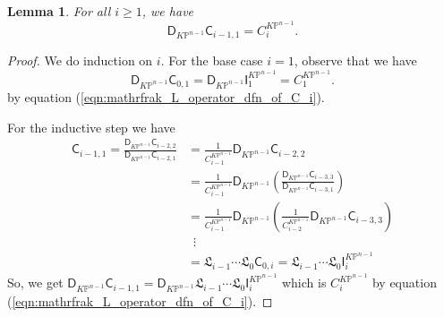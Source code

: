 \documentclass[12pt]{amsart}
\newtheorem{lem}[prop]{Lemma}
\numberwithin{equation}{section}
\newcommand{\KP}{K\mathbb{P}}
\begin{document}
\begin{lem}
For all $i\geq{1}$, we have
\begin{equation*}
\mathsf{D}_{K\mathbb{P}^{n-1}}\mathsf{C}_{i-1,1}=C^{\KP^{n-1}}_i.
\end{equation*}
\end{lem}
\begin{proof}
We do induction on $i$. For the base case $i=1$, observe that we have
\begin{equation*}
\mathsf{D}_{K\mathbb{P}^{n-1}}\mathsf{C}_{0,1}=\mathsf{D}_{K\mathbb{P}^{n-1}}\mathsf{I}_1^{\KP^{n-1}}=C_1^{\KP^{n-1}}.
\end{equation*}
by equation (\ref{eqn:mathrfrak_L_operator_dfn_of_C_i}).

For the inductive step we have
\begin{equation*}
\begin{split}
\mathsf{C}_{i-1,1}=\frac{\mathsf{D}_{K\mathbb{P}^{n-1}}\mathsf{C}_{i-2,2}}{\mathsf{D}_{K\mathbb{P}^{n-1}}\mathsf{C}_{i-2,1}}
&=\frac{1}{C^{\KP^{n-1}}_{i-1}}\mathsf{D}_{K\mathbb{P}^{n-1}}\mathsf{C}_{i-2,2}\\
&=\frac{1}{C^{\KP^{n-1}}_{i-1}}\mathsf{D}_{K\mathbb{P}^{n-1}}\left(\frac{\mathsf{D}_{K\mathbb{P}^{n-1}}\mathsf{C}_{i-3,3}}{\mathsf{D}_{K\mathbb{P}^{n-1}}\mathsf{C}_{i-3,1}}\right)\\
&=\frac{1}{C^{\KP^{n-1}}_{i-1}}\mathsf{D}_{K\mathbb{P}^{n-1}}\left(\frac{1}{C^{\KP^{n-1}}_{i-2}}\mathsf{D}_{K\mathbb{P}^{n-1}}\mathsf{C}_{i-3,3}\right)\\
&\,\,\,\vdots\\
&=\mathfrak{L}_{i-1}\cdots\mathfrak{L}_0\mathsf{C}_{0,i}=\mathfrak{L}_{i-1}\cdots\mathfrak{L}_0\mathsf{I}^{\KP^{n-1}}_i
\end{split}
\end{equation*}
So, we get $\mathsf{D}_{\KP^{n-1}}\mathsf{C}_{i-1,1}=\mathsf{D}_{\KP^{n-1}}\mathfrak{L}_{i-1}\cdots\mathfrak{L}_0\mathsf{I}^{\KP^{n-1}}_i$
which is $C^{\KP^{n-1}}_i$ by equation (\ref{eqn:mathrfrak_L_operator_dfn_of_C_i}). 
\end{proof}
\end{document}
